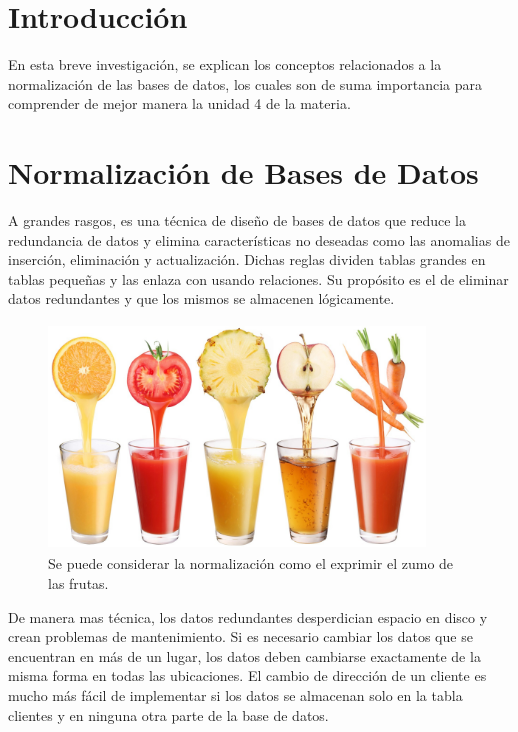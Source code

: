 \documentclass[letterpaper, 12pt]{article}
\begin{document}
    \newpage
    \begin{justify}
        \setcounter{page}{1}
        \thispagestyle{fancy}
        \section{Introducción}
        \justify
        En esta breve investigación, se explican los conceptos relacionados a la normalización de las bases de datos, los cuales son
        de suma importancia para comprender de mejor manera la unidad 4 de la materia.
        \section{Normalización de Bases de Datos}
        \justify
        A grandes rasgos, es una técnica de diseño de bases de datos que reduce la redundancia de datos y elimina características no deseadas
        como las anomalias de inserción, eliminación y actualización. Dichas reglas dividen tablas grandes en tablas pequeñas y las enlaza con
        usando relaciones. Su propósito es el de eliminar datos redundantes y que los mismos se almacenen lógicamente.
        \begin{figure}[H]
            \centering
            \includegraphics[width=10cm,height=6cm]{frutas.jpg}
            \caption{Se puede considerar la normalización como el exprimir el zumo de las frutas.}
        \end{figure}
        \justify
        De manera mas técnica, los datos redundantes desperdician espacio en disco y crean problemas de mantenimiento. Si es necesario cambiar los datos
        que se encuentran en más de un lugar, los datos deben cambiarse exactamente de la misma forma en todas las ubicaciones. El cambio de dirección
        de un cliente es mucho más fácil de implementar si los datos se almacenan solo en la tabla clientes y en ninguna otra parte de la base de datos.

\end{justify}
\end{document}
